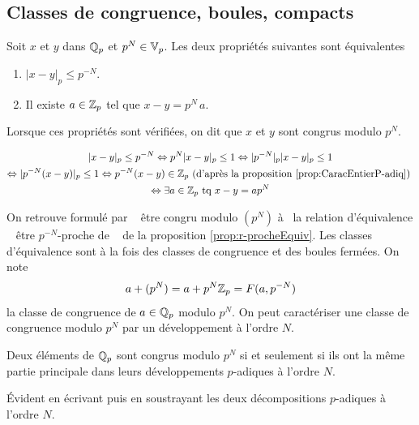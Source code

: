 \subsection{Classes de congruence, boules, compacts}
\begin{defi}
 Soit $x$ et $y$ dans $\mathbb{Q}_p$ et $p^N \in \mathbb{V}_p$. Les deux propriétés suivantes sont équivalentes
 \begin{enumerate}
  \item $|x-y|_p \leq p^{-N}$.
  \item Il existe $a\in \mathbb{Z}_p$ tel que $x-y = p^N\, a$.
 \end{enumerate}
\end{defi}
Lorsque ces propriétés sont vérifiées, on dit que $x$ et $y$ sont congrus modulo $p^N$.
\begin{demo}
\begin{multline*}
 |x-y|_p \leq p^{-N} \Leftrightarrow p^{N}|x-y|_p \leq 1
 \Leftrightarrow |p^{-N}|_p|x-y|_p \leq 1 \\
 \Leftrightarrow |p^{-N} (x-y)|_p \leq 1
 \Leftrightarrow p^{-N} (x-y) \in \mathbb{Z}_p \text{ (d'après la proposition \ref{prop:CaracEntierP-adiq}) }\\
 \Leftrightarrow \exists a \in \mathbb{Z}_p \text{ tq }x-y = a p^N
\end{multline*}
\end{demo}
\noindent On retrouve formulé par \og~ être congru modulo $(p^N)$ à~\fg{} la relation d'équivalence  \og~ être $p^{-N}$-proche de ~\fg{} de la proposition \ref{prop:r-procheEquiv}. Les classes d'équivalence sont à la fois des classes de congruence et des boules fermées. On note
\begin{displaymath}
 a + (p^N) = a + p^N \mathbb{Z}_p = F(a,p^{-N})
\end{displaymath}
la classe de congruence de $a \in \mathbb{Q}_p$ modulo $p^N$.\newline
On peut caractériser une classe de congruence modulo $p^N$ par un développement à l'ordre $N$.
\begin{prop}
Deux éléments de $\mathbb{Q}_p$ sont congrus modulo $p^N$ si et seulement si ils ont la même partie principale dans leurs développements $p$-adiques à l'ordre $N$.
\end{prop}
\begin{demo}
Évident en écrivant puis en soustrayant les deux décompositions $p$-adiques à l'ordre $N$.
\end{demo}

